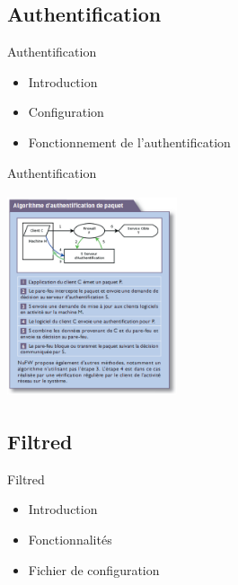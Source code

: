 \documentclass[t,12pt]{beamer}
\begin{document}
	  \subsection{Authentification}
	  \begin{frame}                                                         %
	      \begin{center}{\textcolor{grisbleu}{\Large Authentification}}\end{center} %
	      \begin{itemize}                                                 %
		\item Introduction
		\newline
		\item Configuration
		 \newline
		\item Fonctionnement de l'authentification
	  \end{itemize}
	  \end{frame} 


	  \begin{frame}                                                         %
	      \begin{center}{\textcolor{grisbleu}{\Large Authentification}}\end{center} %
		  \begin{center}\includegraphics[width=5cm,height=6cm]{images/auth.png}\end{center}
	  \end{frame} 

	  \subsection{Filtred}
	  \begin{frame}                                                         %
	      \begin{center}{\textcolor{grisbleu}{\Large Filtred}}\end{center} %
	      \begin{itemize}                                                   %
		\item Introduction
		\newline
		\item Fonctionnalités
		\newline
		\item Fichier de configuration
	  \end{itemize}
	  \end{frame} 
\end{document}

